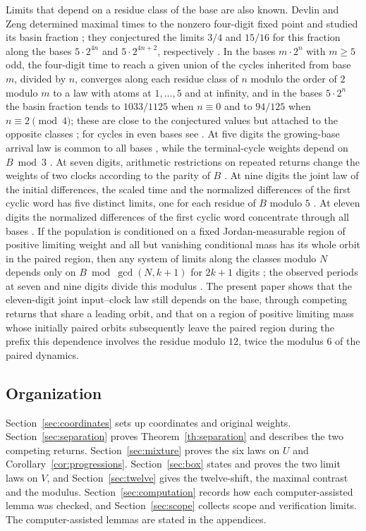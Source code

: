 \documentclass[11pt,reqno]{amsart}
\theoremstyle{remark}
\begin{document}
Limits that depend on a residue class of the base are also known. Devlin and Zeng determined maximal times to the nonzero four-digit fixed point and studied its basin fraction \cite[Theorems~1 and~2]{DZ}; they conjectured the limits \(3/4\) and \(15/16\) for this fraction along the bases \(5\cdot2^{4n}\) and \(5\cdot2^{4n+2}\), respectively \cite[p.~5]{DZ}. In the bases \(m\cdot2^n\) with \(m\ge5\) odd, the four-digit time to reach a given union of the cycles inherited from base \(m\), divided by \(n\), converges along each residue class of \(n\) modulo the order of \(2\) modulo \(m\) to a law with atoms at \(1,\ldots,5\) and at infinity, and in the bases \(5\cdot2^n\) the basin fraction tends to \(1033/1125\) when \(n\equiv0\) and to \(94/125\) when \(n\equiv2\pmod4\); these are close to the conjectured values but attached to the opposite classes \cite[Theorem~2 and Corollary~3]{G2}; for cycles in even bases see \cite[Theorem~1]{G1}. At five digits the growing-base arrival law is common to all bases \cite[Theorem~1]{G3}, while the terminal-cycle weights depend on \(B\bmod3\) \cite[Theorem~3]{G3}. At seven digits, arithmetic restrictions on repeated returns change the weights of two clocks according to the parity of \(B\) \cite[Theorem~1 and \S6]{G5}. At nine digits the joint law of the initial differences, the scaled time and the normalized differences of the first cyclic word has five distinct limits, one for each residue of \(B\) modulo \(5\) \cite[Theorem~2]{G4}. At eleven digits the normalized differences of the first cyclic word concentrate through all bases \cite[Theorem~1]{G6}. If the population is conditioned on a fixed Jordan-measurable region of positive limiting weight and all but vanishing conditional mass has its whole orbit in the paired region, then any system of limits along the classes modulo \(N\) depends only on \(B\bmod\gcd(N,k+1)\) for \(2k+1\) digits \cite[Theorem~4]{G4}; the observed periods at seven and nine digits divide this modulus \cite{G5,G4}. The present paper shows that the eleven-digit joint input--clock law still depends on the base, through competing returns that share a leading orbit, and that on a region of positive limiting mass whose initially paired orbits subsequently leave the paired region during the prefix this dependence involves the residue modulo \(12\), twice the modulus \(6\) of the paired dynamics.

\subsection*{Organization}
Section~\ref{sec:coordinates} sets up coordinates and original weights. Section~\ref{sec:separation} proves Theorem~\ref{th:separation} and describes the two competing returns. Section~\ref{sec:mixture} proves the six laws on \(U\) and Corollary~\ref{cor:progressions}. Section~\ref{sec:box} states and proves the two limit laws on \(V\), and Section~\ref{sec:twelve} gives the twelve-shift, the maximal contrast and the modulus. Section~\ref{sec:computation} records how each computer-assisted lemma was checked, and Section~\ref{sec:scope} collects scope and verification limits. The computer-assisted lemmas are stated in the appendices.
\end{document}
